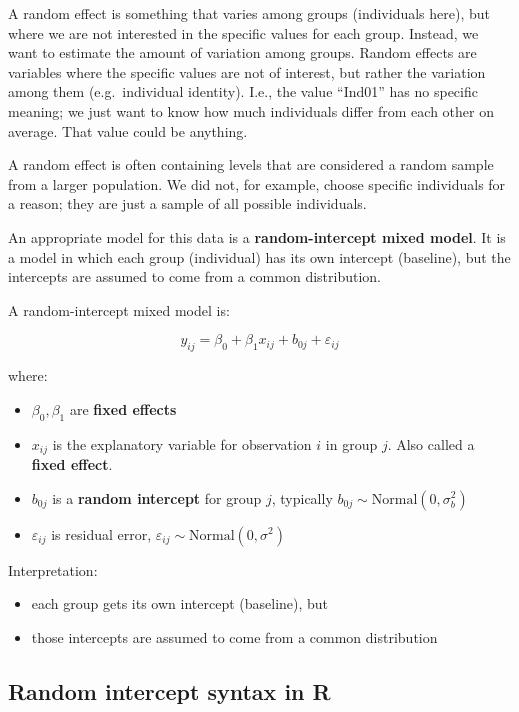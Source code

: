 \documentclass[
  letterpaper,
  8pt,
  a4paper]{book}
\providecommand{\tightlist}{%
  \setlength{\itemsep}{0pt}\setlength{\parskip}{0pt}}
\begin{document}
A random effect is something that varies among groups (individuals
here), but where we are not interested in the specific values for each
group. Instead, we want to estimate the amount of variation among
groups. Random effects are variables where the specific values are not
of interest, but rather the variation among them (e.g.~individual
identity). I.e., the value ``Ind01'' has no specific meaning; we just
want to know how much individuals differ from each other on average.
That value could be anything.

A random effect is often containing levels that are considered a random
sample from a larger population. We did not, for example, choose
specific individuals for a reason; they are just a sample of all
possible individuals.

An appropriate model for this data is a \textbf{random-intercept mixed
model}. It is a model in which each group (individual) has its own
intercept (baseline), but the intercepts are assumed to come from a
common distribution.

A random-intercept mixed model is:

\[y_{ij} = \beta_0 + \beta_1 x_{ij} + b_{0j} + \varepsilon_{ij}\]

where:

\begin{itemize}
\tightlist
\item
  \(\beta_0, \beta_1\) are \textbf{fixed effects}
\item
  \(x_{ij}\) is the explanatory variable for observation \(i\) in group
  \(j\). Also called a \textbf{fixed effect}.
\item
  \(b_{0j}\) is a \textbf{random intercept} for group \(j\), typically
  \(b_{0j} \sim \text{Normal}(0,\sigma_b^2)\)
\item
  \(\varepsilon_{ij}\) is residual error,
  \(\varepsilon_{ij} \sim \text{Normal}(0,\sigma^2)\)
\end{itemize}

Interpretation:

\begin{itemize}
\tightlist
\item
  each group gets its own intercept (baseline), but
\item
  those intercepts are assumed to come from a common distribution
\end{itemize}

\subsection*{Random intercept syntax in
R}\label{random-intercept-syntax-in-r}
\end{document}
